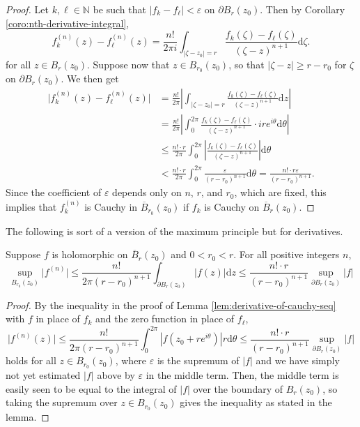 \documentclass[10pt]{article}
\providecommand{\ol}{\overline}
\providecommand{\eps}{\varepsilon}
\providecommand{\dd}{\mathrm d}
\providecommand{\NN}{\mathbb N}
\providecommand{\abs}[1]{\left\lvert{#1}\right\rvert}
\providecommand{\smabs}[1]{\lvert{#1}\rvert}
\begin{document}
\begin{proof}
    Let $k,\ell\in\NN$ be such that
    $\abs{f_k-f_{\ell}} < \eps$ on $\partial B_r(z_0)$.
    Then by Corollary \ref{coro:nth-derivative-integral},
    \begin{equation*}
	f_k^{(n)}(z) - f_\ell^{(n)}(z)
	= \frac{n!}{2\pi i}\int_{\abs{\zeta-z_0}=r}
	\frac{f_k(\zeta)-f_\ell(\zeta)} {(\zeta-z)^{n+1}}\dd\zeta.
    \end{equation*}
    for all $z\in B_r(z_0)$. Suppose now that $z\in B_{r_0}(z_0)$,
    so that $\abs{\zeta-z}\ge r-r_0$ for $\zeta$ on $\partial B_r(z_0)$.
    We then get
    \begin{align*}
	\smabs{f_k^{(n)}(z) - f_\ell^{(n)}(z)}
	&= \frac{n!}{2\pi}\abs{\int_{\abs{\zeta-z_0}=r}
	\frac{f_k(\zeta)-f_\ell(\zeta)}{(\zeta-z)^{n+1}}\dd z}\\
	&= \frac{n!}{2\pi}\abs{\int_0^{2\pi} \frac{f_k(\zeta)-f_\ell(\zeta)}
	{(\zeta-z)^{n+1}}\cdot ire^{i\theta}\dd \theta}\\
	&\le \frac{n!\cdot r}{2\pi}\int_0^{2\pi}\abs{\frac{f_k(\zeta)-f_\ell(\zeta)}
	{(\zeta-z)^{n+1}}}\dd\theta\\
	&< \frac{n!\cdot r}{2\pi}
	\int_0^{2\pi}\frac{\eps}{(r-r_0)^{n+1}}\dd\theta
	= \frac{n!\cdot r\eps}{(r-r_0)^{n+1}}.
    \end{align*}
    Since the coefficient of $\eps$ depends only on $n$, $r$, and $r_0$,
    which are fixed, this implies that $f_k^{(n)}$ is Cauchy
    in $\ol B_{r_0}(z_0)$ if $f_k$ is Cauchy on $\ol B_r(z_0)$.
\end{proof}

The following is sort of a version of the maximum principle
but for derivatives.
\begin{lemma}
    \label{lem:norm-estimate-nth-derivative}
    Suppose $f$ is holomorphic on $\ol B_r(z_0)$ and $0 < r_0 < r$.
    For all positive integers $n$,
    \begin{equation*}
	\sup_{B_{r_0}(z_0)}\smabs{f^{(n)}}
	\le \frac{n!}{2\pi(r-r_0)^{n+1}}
	\int_{\partial B_r(z_0)}\abs{f(z)}\dd z
	\le \frac{n!\cdot r}{(r-r_0)^{n+1}}\sup_{\partial B_r(z_0)}\abs f
    \end{equation*}
\end{lemma}

\begin{proof}
    By the inequality in the proof of
    Lemma \ref{lem:derivative-of-cauchy-seq}
    with $f$ in place of $f_k$ and the zero function in place of $f_\ell$,
    \begin{equation*}
	\smabs{f^{(n)}(z)}
	\le \frac{n!}{2\pi(r-r_0)^{n+1}}\int_0^{2\pi}
	\abs{f(z_0+re^{i\theta})}r\dd\theta
	\le \frac{n!\cdot r}{(r-r_0)^{n+1}}\sup_{\partial B_r(z_0)}\abs f
    \end{equation*}
    holds for all $z\in B_{r_0}(z_0)$,
    where $\eps$ is the supremum of $\abs f$
    and we have simply not yet estimated $\abs f$ above by $\eps$
    in the middle term. Then, the middle term is easily seen to be
    equal to the integral of $\abs f$ over the boundary of $B_r(z_0)$,
    so taking the supremum over $z\in B_{r_0}(z_0)$
    gives the inequality as stated in the lemma.
\end{proof}
\end{document}
